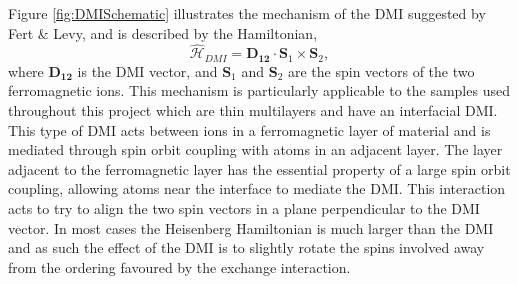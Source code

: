     Figure \ref{fig:DMISchematic} illustrates the mechanism of the DMI suggested by Fert \& Levy, and is described by the Hamiltonian,
    \begin{equation}
	    \mathcal{\hat{H}}_{DMI}=\boldsymbol{D_{12}}\cdot\boldsymbol{S}_{1}\times\boldsymbol{S}_{2},
    \end{equation}
    where $\boldsymbol{D_{12}}$ is the DMI vector, and  $\boldsymbol{S}_{1}$ and $\boldsymbol{S}_{2}$ are the spin vectors of the two ferromagnetic ions. This mechanism is particularly applicable to the samples used throughout this project which are thin multilayers and have an interfacial DMI. This type of DMI acts between ions in a ferromagnetic layer of material and is mediated through spin orbit coupling with atoms in an adjacent layer. The layer adjacent to the ferromagnetic layer has the essential property of a large spin orbit coupling, allowing atoms near the interface to mediate the DMI.  This interaction acts to try to align the two spin vectors in a plane perpendicular to the DMI vector. In most cases the Heisenberg Hamiltonian is much larger than the DMI and as such the effect of the DMI is to slightly rotate the spins involved away from the ordering favoured by the exchange interaction.
	

